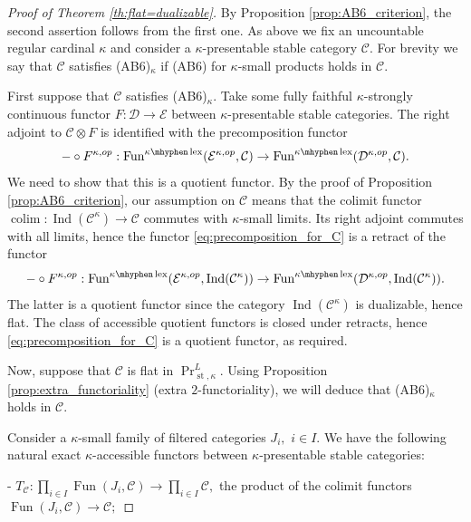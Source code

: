 \documentclass[11pt,leqno]{amsart}
\numberwithin{equation}{section}
\DeclareMathOperator*{\colim}{colim}
\newcommand{\hy}{\mhyphen}
\newcommand{\prodd}[1][]{\mathop{\prod}\limits_{#1}}
\newcommand{\lex}{\operatorname{lex}}
\newcommand{\st}{\operatorname{st}}
\newcommand{\cD}{{\mathcal D}}
\newcommand{\cC}{{\mathcal C}}
\newcommand{\cE}{{\mathcal E}}
\newcommand{\Fun}{\operatorname{Fun}}
\newcommand{\Ind}{\operatorname{Ind}}
\begin{document}
\begin{proof}[Proof of Theorem \ref{th:flat=dualizable}] By Proposition \ref{prop:AB6_criterion}, the second assertion follows from the first one. As above we fix an uncountable regular cardinal $\kappa$ and consider a $\kappa$-presentable stable category $\cC.$ For brevity we say that $\cC$ satisfies (AB6)$_{\kappa}$ if (AB6) for $\kappa$-small products holds in $\cC.$ 

First suppose that $\cC$ satisfies (AB6)$_{\kappa}.$ Take some fully faithful $\kappa$-strongly continuous functor $F:\cD\to\cE$ between $\kappa$-presentable stable categories. The right adjoint to $\cC\otimes F$ is identified with the precomposition functor
\begin{equation}\label{eq:precomposition_for_C}
-\circ F^{\kappa,op}:\Fun^{\kappa\hy\lex}(\cE^{\kappa,op},\cC)\to \Fun^{\kappa\hy\lex}(\cD^{\kappa,op},\cC).
\end{equation}
We need to show that this is a quotient functor. By the proof of Proposition \ref{prop:AB6_criterion}, our assumption on $\cC$ means that the colimit functor $\colim:\Ind(\cC^{\kappa})\to\cC$ commutes with $\kappa$-small limits. Its right adjoint commutes with all limits, hence the functor \eqref{eq:precomposition_for_C} is a retract of the functor
\begin{equation*}\label{eq:precomposition_for_Ind_C_kappa}
	-\circ F^{\kappa,op}:\Fun^{\kappa\hy\lex}(\cE^{\kappa,op},\Ind(\cC^{\kappa}))\to \Fun^{\kappa\hy\lex}(\cD^{\kappa,op},\Ind(\cC^{\kappa})).
\end{equation*}
The latter is a quotient functor since the category $\Ind(\cC^{\kappa})$ is dualizable, hence flat. The class of accessible quotient functors is closed under retracts, hence \eqref{eq:precomposition_for_C} is a quotient functor, as required.

Now, suppose that $\cC$ is flat in $\Pr^L_{\st,\kappa}.$ Using Proposition \ref{prop:extra_functoriality} (extra $2$-functoriality), we will deduce that (AB6)$_{\kappa}$ holds in $\cC.$

Consider a $\kappa$-small family of filtered categories $J_i,$ $i\in I.$ 
We have the following natural exact $\kappa$-accessible functors between $\kappa$-presentable stable categories:

- $T_{\cC}:\prodd[i\in I]\Fun(J_i,\cC)\to \prodd[i\in I] \cC,$ the product of the colimit functors $\Fun(J_i,\cC)\to \cC;$


\end{proof}
\end{document}
